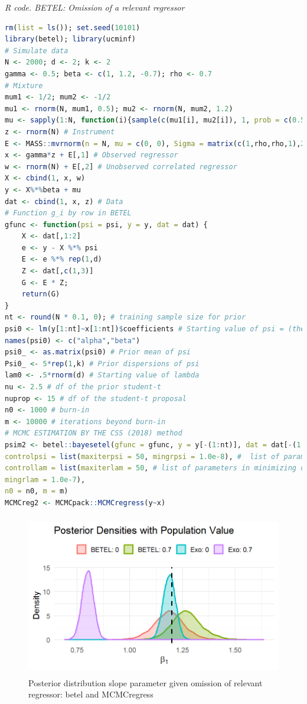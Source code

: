 \begin{enumerate}[leftmargin=*]
\begin{tcolorbox}[enhanced,width=4.67in,center upper,
	fontupper=\large\bfseries,drop shadow southwest,sharp corners]
	\textit{R code. BETEL: Omission of a relevant regressor}
	\begin{VF}
		\begin{lstlisting}[language=R]
rm(list = ls()); set.seed(10101)
library(betel); library(ucminf)
# Simulate data
N <- 2000; d <- 2; k <- 2
gamma <- 0.5; beta <- c(1, 1.2, -0.7); rho <- 0.7
# Mixture
mum1 <- 1/2; mum2 <- -1/2
mu1 <- rnorm(N, mum1, 0.5); mu2 <- rnorm(N, mum2, 1.2)
mu <- sapply(1:N, function(i){sample(c(mu1[i], mu2[i]), 1, prob = c(0.5, 0.5))})
z <- rnorm(N) # Instrument
E <- MASS::mvrnorm(n = N, mu = c(0, 0), Sigma = matrix(c(1,rho,rho,1),2,2))
x <- gamma*z + E[,1] # Observed regressor
w <- rnorm(N) + E[,2] # Unobserved correlated regressor
X <- cbind(1, x, w)
y <- X%*%beta + mu
dat <- cbind(1, x, z) # Data
# Function g_i by row in BETEL
gfunc <- function(psi = psi, y = y, dat = dat) {
	X <- dat[,1:2]
	e <- y - X %*% psi
	E <- e %*% rep(1,d)
	Z <- dat[,c(1,3)]
	G <- E * Z;
	return(G)
}
nt <- round(N * 0.1, 0); # training sample size for prior
psi0 <- lm(y[1:nt]~x[1:nt])$coefficients # Starting value of psi = (theta, v), v is the slack parameter in CSS (2018)
names(psi0) <- c("alpha","beta")
psi0_ <- as.matrix(psi0) # Prior mean of psi 
Psi0_ <- 5*rep(1,k) # Prior dispersions of psi
lam0 <- .5*rnorm(d) # Starting value of lambda
nu <- 2.5 # df of the prior student-t
nuprop <- 15 # df of the student-t proposal
n0 <- 1000 # burn-in
m <- 10000 # iterations beyond burn-in
# MCMC ESTIMATION BY THE CSS (2018) method
psim2 <- betel::bayesetel(gfunc = gfunc, y = y[-(1:nt)], dat = dat[-(1:nt),], psi0 = psi0, lam0 = lam0, psi0_ = psi0_, Psi0_ = Psi0_, nu = nu, nuprop = nuprop,
controlpsi = list(maxiterpsi = 50, mingrpsi = 1.0e-8), #  list of parameters in maximizing likelihood over psi
controllam = list(maxiterlam = 50, # list of parameters in minimizing dual over lambda
mingrlam = 1.0e-7),
n0 = n0, m = m)
MCMCreg2 <- MCMCpack::MCMCregress(y~x)
\end{lstlisting}
	\end{VF}
\end{tcolorbox} 

\begin{figure}[h!]
	\includegraphics[width=340pt, height=200pt]{Chapters/chapter12/figures/FigOM.png}
	\caption[List of figure caption goes here]{Posterior distribution slope parameter given omission of relevant regressor: betel and MCMCregress}\label{fig12_Omission}
\end{figure} 

\end{enumerate}